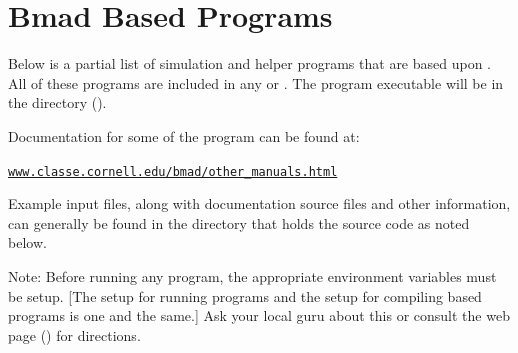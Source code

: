 \documentclass{hitec}     %
\newcommand{\Section}[1]{\section{#1}\vspace*{-1ex}}
\newenvironment{display}
  {\vspace*{-1.5ex} \begin{alltt}}
  {\end{alltt} \vspace*{-1.0ex}}
\begin{document}
\newpage

\Section{Bmad Based Programs}
\label{s:programs}

Below is a partial list of simulation and helper programs that are based upon \bmad. All of these
programs are included in any  or . The program executable will be in
the  directory ().

Documentation for some of the program can be found at:
\begin{display}
  \url{www.classe.cornell.edu/bmad/other_manuals.html}
\end{display}
Example input files, along with documentation source files and other information, can generally be
found in the directory that holds the source code as noted below.

Note: Before running any program, the appropriate environment variables must be setup. [The setup
for running programs and the setup for compiling \bmad based programs is one and the same.] Ask your
local \bmad guru about this or consult the \bmad web page () for directions.
\end{document}
